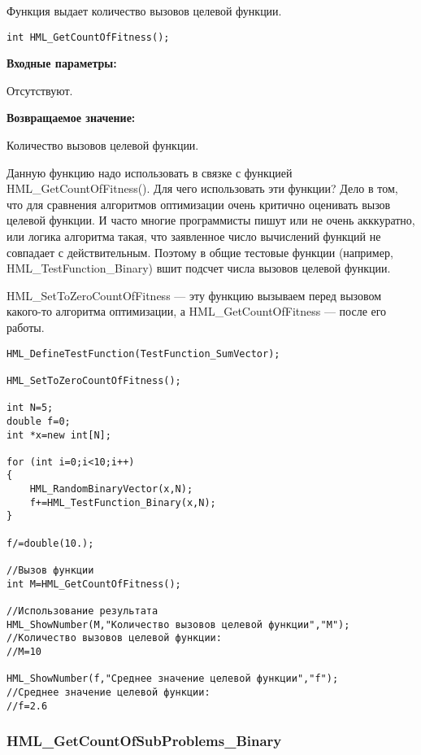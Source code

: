 \documentclass[a4paper,12pt]{article}
\begin{document}
Функция выдает количество вызовов целевой функции.


\begin{lstlisting}[label=code_syntax_HML_GetCountOfFitness,caption=Синтаксис]
int HML_GetCountOfFitness();
\end{lstlisting}

\textbf{Входные параметры:}

Отсутствуют.

\textbf{Возвращаемое значение:}
 
Количество вызовов целевой функции.

Данную функцию надо использовать в связке с функцией HML\_GetCountOfFitness(). Для чего использовать эти функции? Дело в том, что для сравнения алгоритмов оптимизации очень критично оценивать вызов целевой функции. И часто многие программисты пишут или не очень акккуратно, или логика алгоритма такая, что заявленное число вычислений функций не совпадает с действительным. Поэтому в общие тестовые функции (например, HML\_TestFunction\_Binary) вшит подсчет числа вызовов целевой функции.

HML\_SetToZeroCountOfFitness --- эту функцию вызываем перед вызовом какого-то алгоритма оптимизации, а HML\_GetCountOfFitness --- после его работы.


\begin{lstlisting}[label=code_use_HML_GetCountOfFitness,caption=Пример использования]
HML_DefineTestFunction(TestFunction_SumVector);

HML_SetToZeroCountOfFitness();

int N=5;
double f=0;
int *x=new int[N];

for (int i=0;i<10;i++)
{
    HML_RandomBinaryVector(x,N);
    f+=HML_TestFunction_Binary(x,N);
}

f/=double(10.);

//Вызов функции
int M=HML_GetCountOfFitness();

//Использование результата
HML_ShowNumber(M,"Количество вызовов целевой функции","M");
//Количество вызовов целевой функции:
//M=10

HML_ShowNumber(f,"Среднее значение целевой функции","f");
//Среднее значение целевой функции:
//f=2.6
\end{lstlisting}

\subsubsection{HML\_GetCountOfSubProblems\_Binary}\label{HML_GetCountOfSubProblems_Binary}
\end{document}
